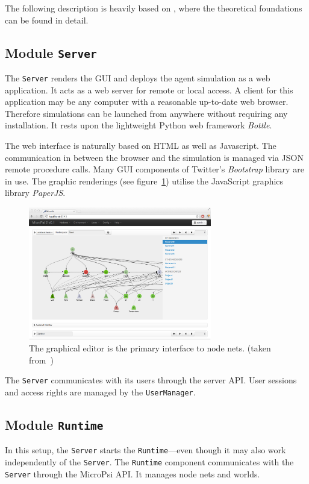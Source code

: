 The following description is heavily based on \cite{conf/agi/Bach12}, where the theoretical foundations can be found in detail.

        \subsection{Module \texttt{Server}}
The \texttt{Server} renders the GUI and deploys the agent simulation as a web application. It acts as a web server for remote or local access. A client for this application may be any computer with a reasonable up-to-date web browser. Therefore simulations can be launched from anywhere without requiring any installation. It rests upon the lightweight Python web framework \emph{Bottle}.

The web interface is naturally based on HTML as well as Javascript. The communication in between the browser and the simulation is managed via JSON remote procedure calls. Many GUI components of Twitter's \emph{Bootstrap} library are in use. The graphic renderings (see figure~\ref{micropsi2_nodenet}) utilise the JavaScript graphics library \emph{PaperJS}. 

\begin{figure}[h]
  \centering
    \includegraphics[width=8cm]{graphics/micropsi2_nodenet}
  \caption{The graphical editor is the primary interface to node nets. (taken from~\cite{conf/agi/Bach12})}
  \label{micropsi2_nodenet}
\end{figure}

The \texttt{Server} communicates with its users through the server API. User sessions and access rights are managed by the \texttt{UserManager}.
   
        \subsection{Module \texttt{Runtime}}
In this setup, the \texttt{Server} starts the \texttt{Runtime}---even though it may also work independently of the \texttt{Server}. The \texttt{Runtime} component communicates with the \texttt{Server} through the MicroPsi API. It manages node nets and worlds.

